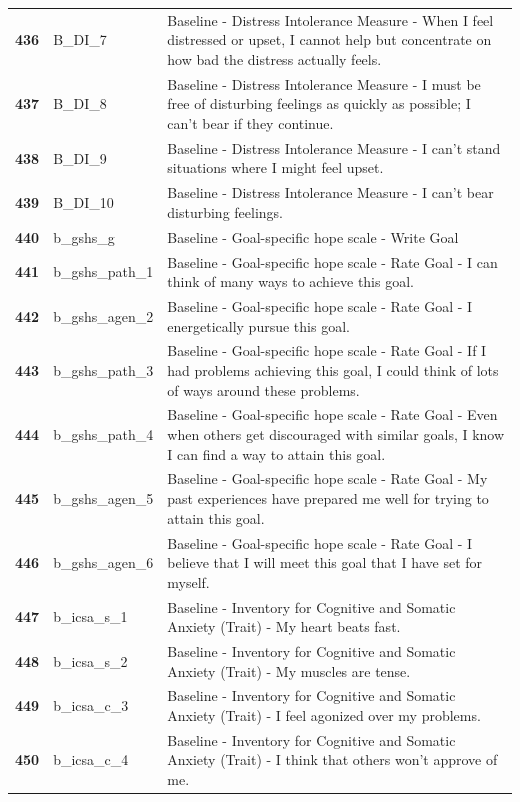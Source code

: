 \documentclass[
  letterpaper,
  DIV=11,
  numbers=noendperiod]{scrartcl}
\begin{document}
\begin{longtable}[t]{>{}cll}
\addlinespace
\textbf{436} & B\_DI\_7 & Baseline - Distress Intolerance Measure - When I feel distressed or upset, I cannot help but concentrate on how bad the distress actually feels.\\
\textbf{437} & B\_DI\_8 & Baseline - Distress Intolerance Measure - I must be free of disturbing feelings as quickly as possible; I can't bear if they continue.\\
\textbf{438} & B\_DI\_9 & Baseline - Distress Intolerance Measure - I can't stand situations where I might feel upset.\\
\textbf{439} & B\_DI\_10 & Baseline - Distress Intolerance Measure - I can't bear disturbing feelings.\\
\textbf{440} & b\_gshs\_g & Baseline - Goal-specific hope scale - Write Goal\\
\addlinespace
\textbf{441} & b\_gshs\_path\_1 & Baseline - Goal-specific hope scale - Rate Goal - I can think of many ways to achieve this goal.\\
\textbf{442} & b\_gshs\_agen\_2 & Baseline - Goal-specific hope scale - Rate Goal - I energetically pursue this goal.\\
\textbf{443} & b\_gshs\_path\_3 & Baseline - Goal-specific hope scale - Rate Goal - If I had problems achieving this goal, I could think of lots of ways around these problems.\\
\textbf{444} & b\_gshs\_path\_4 & Baseline - Goal-specific hope scale - Rate Goal - Even when others get discouraged with similar goals, I know I can find a way to attain this goal.\\
\textbf{445} & b\_gshs\_agen\_5 & Baseline - Goal-specific hope scale - Rate Goal - My past experiences have prepared me well for trying to attain this goal.\\
\addlinespace
\textbf{446} & b\_gshs\_agen\_6 & Baseline - Goal-specific hope scale - Rate Goal - I believe that I will meet this goal that I have set for myself.\\
\textbf{447} & b\_icsa\_s\_1 & Baseline - Inventory for Cognitive and Somatic Anxiety (Trait) - My heart beats fast.\\
\textbf{448} & b\_icsa\_s\_2 & Baseline - Inventory for Cognitive and Somatic Anxiety (Trait) - My muscles are tense.\\
\textbf{449} & b\_icsa\_c\_3 & Baseline - Inventory for Cognitive and Somatic Anxiety (Trait) - I feel agonized over my problems.\\
\textbf{450} & b\_icsa\_c\_4 & Baseline - Inventory for Cognitive and Somatic Anxiety (Trait) - I think that others won’t approve of me.\\

\end{longtable}
\end{document}

